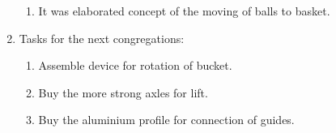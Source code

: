 \begin{enumerate}
\begin{enumerate}
      \item It was elaborated concept of the moving of balls to basket.
    \end{enumerate}
    
	\item Tasks for the next congregations:
	\begin{enumerate}
	  \item Assemble device for rotation of bucket.
	  
	  \item Buy the more strong axles for lift.
	  
	  \item Buy the aluminium profile for connection of guides.
    \end{enumerate}     
\end{enumerate}
\fillpage
